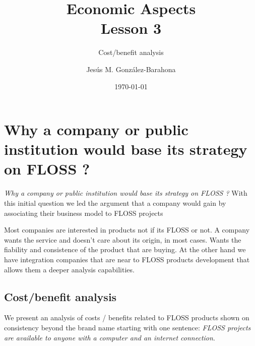 \documentclass[11pt]{scrartcl}
\title{\textbf{Economic Aspects\\
                Lesson 3}}
\subtitle{Cost/benefit analysis}
\author{Jesús M. González-Barahona}
\date{\today}
\begin{document}
\maketitle

\section{Why a company or public institution would base its strategy on FLOSS ?}

\emph{Why a company or public institution would base its strategy on FLOSS ?} With this initial question we led the argument that a company would gain by associating their business model to FLOSS projects 

Most companies are interested in products not if its FLOSS or not. A company wants the service and doesn't care about its origin, in most cases. Wants the fiability and consistence of the product that are buying. At the other hand we have integration companies that are near to FLOSS products development that allows them a deeper analysis capabilities.

\subsection{Cost/benefit analysis}

We present an analysis of costs / benefits related to FLOSS products shown on consistency beyond the brand name starting with one sentence: \emph{FLOSS projects are available to anyone with a computer and an internet connection}.
\end{document}
